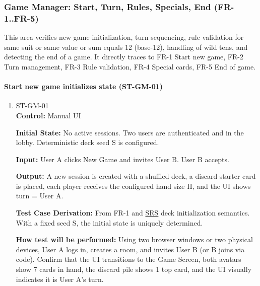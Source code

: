 \documentclass[12pt, titlepage]{article}
\begin{document}
\subsubsection{Game Manager: Start, Turn, Rules, Specials, End (FR-1..FR-5)}

This area verifies new game initialization, turn sequencing, rule validation for same suit or same value or sum equals 12 (base-12), handling of wild tens, and detecting the end of a game. It directly traces to FR-1 Start new game, FR-2 Turn management, FR-3 Rule validation, FR-4 Special cards, FR-5 End of game.

\paragraph{Start new game initializes state (ST-GM-01)}
\begin{enumerate}
\item{ST-GM-01\\}
\textbf{Control:} Manual UI

\textbf{Initial State:} No active sessions. Two users are authenticated and in the lobby. Deterministic deck seed S is configured.

\textbf{Input:} User A clicks New Game and invites User B. User B accepts.

\textbf{Output:} A new session is created with a shuffled deck, a discard starter card is placed, each player receives the configured hand size H, and the UI shows turn = User A.

\textbf{Test Case Derivation:} From FR-1 and \href{../SRS/SRS.pdf}{SRS} deck initialization semantics. With a fixed seed S, the initial state is uniquely determined.

\textbf{How test will be performed:} Using two browser windows or two physical devices, User A logs in, creates a room, and invites User B (or B joins via code). Confirm that the UI transitions to the Game Screen, both avatars show 7 cards in hand, the discard pile shows 1 top card, and the UI visually indicates it is User A's turn.
\end{enumerate}
\end{document}
